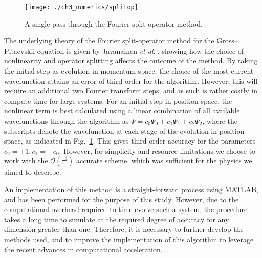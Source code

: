 \begin{figure}
    \centering
    \texttt{[image: ./ch3\_numerics/splitop]}
    \caption{A single pass through the Fourier split-operator method.}
    \label{fig:num_splitop}
\end{figure}

The underlying theory of the Fourier split-operator method for the Gross--Pitaevskii equation is given by Javanainen \textit{et al}. \cite{BEC:Javanainen_jphysa_2006}, showing how the choice of nonlinearity and operator splitting affects the outcome of the method. By taking the initial step as evolution in momentum space, the choice of the most current wavefunction attains an error of third-order for the algorithm. However, this will require an additional two Fourier transform steps, and as such is rather costly in compute time for large systems. For an initial step in position space, the nonlinear term is best calculated using a linear combination of all available wavefunctions through the algorithm as $\Psi = c_0\Psi_0 + c_1\Psi_1 + c_2\Psi_2$, where the subscripts denote the wavefunction at each stage of the evolution in position space, as indicated in Fig.~\ref{fig:num_splitop}. This gives third order accuracy for the parameters $c_2=\pm 1, c_1=-c_0$. However, for simplicity and resource limitations we choose to work with the $\mathcal{O}\left(\tau^2\right)$ accurate scheme, which was sufficient for the physics we aimed to describe.

An implementation of this method is a straight-forward process using MATLAB, and has been performed for the purpose of this study. However, due to the computational overhead required to time-evolve such a system, the procedure takes a long time to simulate at the required degree of accuracy for any dimension greater than one. Therefore, it is necessary to further develop the methods used, and to improve the implementation of this algorithm to leverage the recent advances in computational acceleration.

